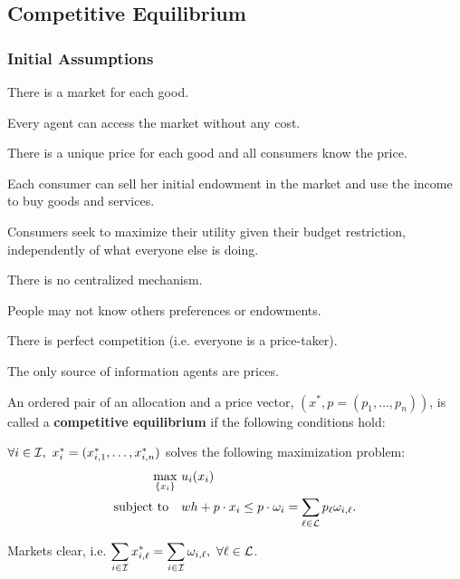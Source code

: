 \documentclass[8pt,a4paper]{extarticle}
\begin{document}
\begin{multicols}{3}
\subsection{Competitive Equilibrium}

\subsubsection*{Initial Assumptions}

\begin{bulletlist}
\item There is a market for each good.
\item Every agent can access the market without any cost.
\item There is a unique price for each good and all consumers know the price.
\item Each consumer can sell her initial endowment in the market and use the income to buy goods and services.
\item Consumers seek to maximize their utility given their budget restriction, independently of what everyone else is doing.
\item There is no centralized mechanism.
\item People may not know others preferences or endowments.
\item There is perfect competition (i.e. everyone is a price-taker).
\item The only source of information agents are prices.
\end{bulletlist}

\begin{boxdef}
	An ordered pair of an allocation and a price vector, $(x^*, p = (p_1, \ldots, p_n))$, is called a \textbf{competitive equilibrium} if the following conditions hold:
	\begin{eqlist}
	\item $\forall i \in \mathcal{I},\ x^*_i = (x^*_{i, 1}, \ldots, x^*_{i, n})$ solves the following maximization problem: 
		\begin{equation*}
		\begin{aligned}
			\max_{\{x_i\}}\	  & u_i(x_i) \\
			\text{\normalfont subject to} \quad & wh + p \cdot x_i \le p \cdot \omega_i = \sum_{\ell \in \LL} p_\ell \omega_{i, \ell}.
		\end{aligned}
		\end{equation*}
	\item Markets clear, i.e. $\displaystyle \sum_{i \in \mathcal{I}} x^*_{i, \ell} = \sum_{i \in \mathcal{I}} \omega_{i, \ell},\ \forall \ell \in \mathcal{L}$.
	\end{eqlist}
\end{boxdef}


\end{multicols}
\end{document}
